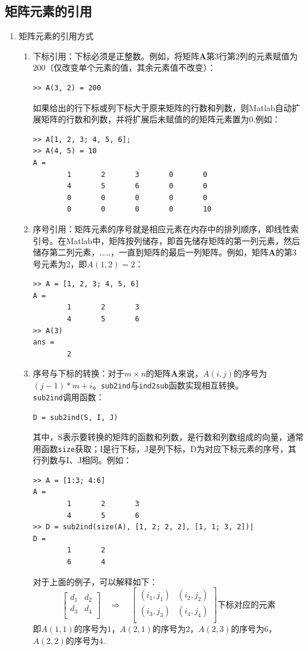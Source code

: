 \subsection{矩阵元素的引用}
\begin{enumerate}
	\item 矩阵元素的引用方式
	\begin{enumerate}
		\item 下标引用：下标必须是正整数。例如，将矩阵$\bm{A}$第3行第2列的元素赋值为200（仅改变单个元素的值，其余元素值不改变）：
		\begin{lstlisting}
>> A(3, 2) = 200
		\end{lstlisting}
		
		如果给出的行下标或列下标大于原来矩阵的行数和列数，则Matlab自动扩展矩阵的行数和列数，并将扩展后未赋值的的矩阵元素置为0.例如：
		\begin{lstlisting}
>> A[1, 2, 3; 4, 5, 6];
>> A(4, 5) = 10
A =
		1		2		3		0		0
		4		5		6		0		0
		0		0		0		0		0
		0		0		0		0		10
		\end{lstlisting}
		
		\item 序号引用：矩阵元素的序号就是相应元素在内存中的排列顺序，即线性索引号。在Matlab中，矩阵按列储存，即首先储存矩阵的第一列元素，然后储存第二列元素，……，一直到矩阵的最后一列矩阵。例如，矩阵$\bm{A}$的第3号元素为2，即$A(1,2) = 2$：
		\begin{lstlisting}
>> A = [1, 2, 3; 4, 5, 6]
A = 
		1		2		3
		4		5		6
>> A(3)
ans = 
		2
		\end{lstlisting}
		
		\item 序号与下标的转换：对于$m\times n$的矩阵$\bm{A}$来说，$A(i,j)$的序号为$(j-1)*m+i$。\lstinline|sub2ind|与\lstinline|ind2sub|函数实现相互转换。\\
		\lstinline|sub2ind|调用函数：
		\begin{center}
			\lstinline|D = sub2ind(S, I, J)|
		\end{center}
		其中，S表示要转换的矩阵的函数和列数，是行数和列数组成的向量，通常用函数\lstinline|size|获取；I是行下标，J是列下标，D为对应下标元素的序号，其行列数与I、J相同。例如：
		\begin{lstlisting}
>> A = [1:3; 4:6]
A = 
		1		2		3
		4		5		6
>> D = sub2ind(size(A), [1, 2; 2, 2], [1, 1; 3, 2])|
D = 
		1		2
		6		4
		\end{lstlisting}
	
		对于上面的例子，可以解释如下：
		\begin{equation*}
			\begin{bmatrix}
				d_1 & d_2 \\
				d_3 & d_4 \\
			\end{bmatrix}
		\quad \Longrightarrow \quad
			\begin{bmatrix}
				(i_1,j_1) & (i_2,j_2) \\
				(i_3,j_3) & (i_4,j_4) \\
			\end{bmatrix}
		\mbox{下标对应的元素}
		\end{equation*}
	即$A(1,1)$的序号为1，$A(2,1)$的序号为2，$A(2,3)$的序号为6，$A(2,2)$的序号为4.
	

\end{enumerate}
\end{enumerate}
